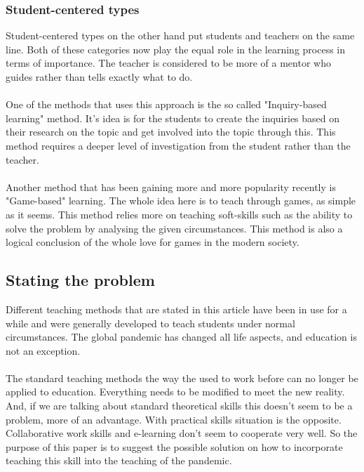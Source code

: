 \documentclass[10pt,oneside,english,a4paper]{article}
\begin{document}
\subsubsection{Student-centered types}
Student-centered types on the other hand put students and teachers on the same line. Both of these categories now play the equal role in the learning process in terms of importance. The teacher is considered to be more of a mentor who guides rather than tells exactly what to do.\paragraph{} 
One of the methods that uses this approach is the so called "Inquiry-based learning" method.\cite{inquiry} It's idea is for the students to create the inquiries based on their research on the topic and get involved into the topic through this. This method requires a deeper level of investigation from the student rather than the teacher. \paragraph{} 
Another method that has been gaining more and more popularity recently is "Game-based" learning. The whole idea here is to teach through games, as simple as it seems. This method relies more on teaching soft-skills such as the ability to solve the problem by analysing the given circumstances. This method is also a logical conclusion of the whole love for games in the modern society.

\subsection{Stating the problem}
Different teaching methods that are stated in this article have been in use for a while and were generally developed to teach students under normal circumstances. The global pandemic has changed all life aspects, and education is not an exception. \paragraph{} 
The standard teaching methods the way the used to work before can no longer be applied to education. Everything needs to be modified to meet the new reality. And, if we are talking about standard theoretical skills this doesn't seem to be a problem, more of an advantage. With practical skills situation is the opposite. Collaborative work skills and e-learning don't seem to cooperate very well. So the purpose of this paper is to suggest the possible solution on how to incorporate teaching this skill into the teaching of the pandemic.
\end{document}
